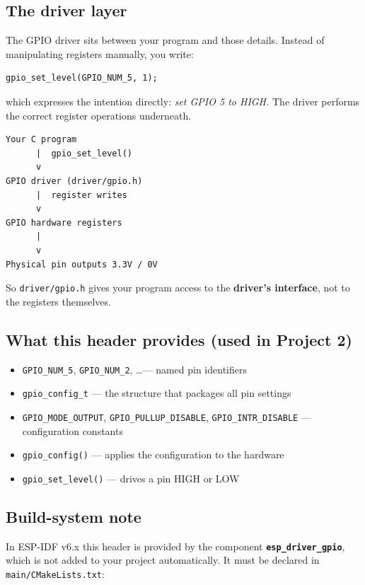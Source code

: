 \documentclass[11pt]{article}
\begin{document}
\subsection{The driver layer}

The GPIO driver sits between your program and those details. Instead of manipulating registers manually, you write:

\begin{verbatim}
gpio_set_level(GPIO_NUM_5, 1);
\end{verbatim}

which expresses the intention directly: \emph{set GPIO 5 to HIGH.} The driver performs the correct register operations underneath.

\begin{verbatim}
Your C program
      |  gpio_set_level()
      v
GPIO driver (driver/gpio.h)
      |  register writes
      v
GPIO hardware registers
      |
      v
Physical pin outputs 3.3V / 0V
\end{verbatim}

So \texttt{driver/gpio.h} gives your program access to the \textbf{driver's interface}, not to the registers themselves.

\subsection{What this header provides (used in Project 2)}

\begin{itemize}
    \item \texttt{GPIO\_NUM\_5}, \texttt{GPIO\_NUM\_2}, \dots --- named pin identifiers
    \item \texttt{gpio\_config\_t} --- the structure that packages all pin settings
    \item \texttt{GPIO\_MODE\_OUTPUT}, \texttt{GPIO\_PULLUP\_DISABLE}, \texttt{GPIO\_INTR\_DISABLE} --- configuration constants
    \item \texttt{gpio\_config()} --- applies the configuration to the hardware
    \item \texttt{gpio\_set\_level()} --- drives a pin HIGH or LOW
\end{itemize}

\subsection{Build-system note}

In ESP-IDF v6.x this header is provided by the component \textbf{\texttt{esp\_driver\_gpio}}, which is not added to your project automatically. It must be declared in \texttt{main/CMakeLists.txt}:
\end{document}
